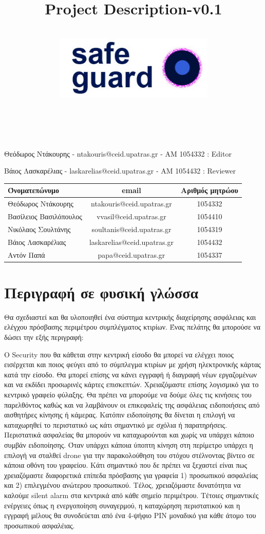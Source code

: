 \documentclass{article}
\title{Project Description-v0.1}
\author{\\
\includegraphics[width=3in]{safeguard}\\[1ex]\\\\
}
\begin{document}
\maketitle

\newpage


Θεόδωρος Ντάκουρης - ntakouris@ceid.upatras.gr - ΑΜ 1054332 : Editor 


Βάιος Λασκαρέλιας - laskarelias@ceid.upatras.gr - ΑΜ 1054432 : Reviewer

\begin{tabular}{|l|c|c|}
\hline
Όνοματεπώνυμο & email & Αριθμός μητρώου  \\
\hline
Θεόδωρος Ντάκουρης & ntakouris@ceid.upatras.gr & 1054332 \\
Βασίλειος Βασιλόπουλος & vvasil@ceid.upatras.gr &  1054410\\
Νικόλαος Σουλτάνης & soultanis@ceid.upatras.gr & 1054319  \\
Βάιος Λασκαρέλιας & laskarelias@ceid.upatras.gr & 1054432 \\
Αντόν Παπά & papa@ceid.upatras.gr & 1054337 \\
\hline
\end{tabular}

\renewcommand{\contentsname}{Περιεχόμενα}
\tableofcontents

\section{Περιγραφή σε φυσική γλώσσα}
Θα σχεδιαστεί και θα υλοποιηθεί ένα σύστημα κεντρικής διαχείρησης ασφάλειας και ελέγχου πρόσβασης περιμέτρου συμπλέγματος κτιρίων. Ένας πελάτης θα μπορούσε να δώσει την εξής περιγραφή:


Ο Security που θα κάθεται στην κεντρική είσοδο θα μπορεί να ελέγχει ποιος εισέρχεται και ποιος φεύγει από το σύμπλεγμα κτιρίων
με χρήση ηλεκτρονικής κάρτας κατά την είσοδο. Θα μπορεί επίσης να κάνει εγγραφή ή διαγραφή νέων εργαζομένων και να εκδίδει προσωρινές κάρτες επισκεπτών. Χρειαζόμαστε επίσης λογισμικό για το κεντρικό γραφείο φύλαξης. Θα πρέπει να μπορούμε να δούμε όλες τις κινήσεις του παρελθόντος καθώς και να λαμβάνουν οι επικεφαλείς της ασφάλειας ειδοποιήσεις από αισθητήρες κίνησης ή κάμερας. Κατόπιν ειδοποίησης θα δίνεται η επιλογή να καταχωρηθεί το περιστατικό ως κάτι σημαντικό με σχόλια ή παρατηρήσεις. Περιστατικά ασφαλείας θα μπορούν να καταχωρούνται και χωρίς να υπάρχει κάποιο συμβάν ειδοποίησης. Όταν υπάρχει κάποια ύποπτη κίνηση στη περίμετρο υπάρχει η επιλογή να σταλθεί drone για την παρακολούθηση του στόχου στέλνοντας βίντεο σε κάποια οθόνη του γραφείου. Κάτι σημαντικό που δε πρέπει να ξεχαστεί είναι πως χρειαζόμαστε διαφορετικά επίπεδα πρόσβασης για γραφεία 1) προσωπικού ασφαλείας και 2) επιλεγμένου ανώτερου προσωπικού. Τέλος, χρειαζόμαστε δυνατότητα να καλούμε silent alarm στα κεντρικά από κάθε σημείο περιμέτρου. Τέτοιες σημαντικές ενέργειες όπως η ενεργοποίηση συναγερμού, η καταχώρηση περιστατικού και η εγγραφή μέλους θα συνοδεύεται από ένα 4-ψήφιο PIN μοναδικό για κάθε άτομο του προσωπικού ασφαλέιας.
\end{document}
